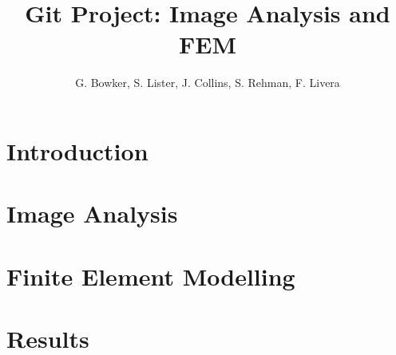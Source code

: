 \documentclass[11pt]{report}
\title{Git Project: Image Analysis and FEM}
\author{G. Bowker, S. Lister, J. Collins, S. Rehman, F. Livera}
\date{}
\begin{document}

\maketitle				%

\section{Introduction}
\section{Image Analysis}
\section{Finite Element Modelling}
\section{Results}
\end{document}
